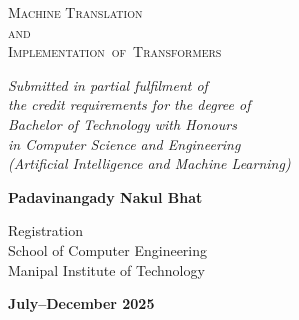 \begin{titlepage}
    \null


    \centering

    {
        \scshape \Huge
        Machine Translation \\
        and \\
        \mbox{Implementation of Transformers} \par
    }

    {
        \itshape \large
        Submitted in partial fulfilment of \\
        the credit requirements for the degree of \\
        Bachelor of Technology with Honours\\
        in
        Computer Science and Engineering \\
        (Artificial Intelligence and Machine Learning) \par
    }

    {
        \bfseries \huge
        Padavinangady Nakul Bhat \par
    }


    {
        \Large
        Registration \\
        School of Computer Engineering\\
        Manipal Institute of Technology \par
    }


    {
        \bfseries \Large 
        July--December 2025
    }


\end{titlepage}
